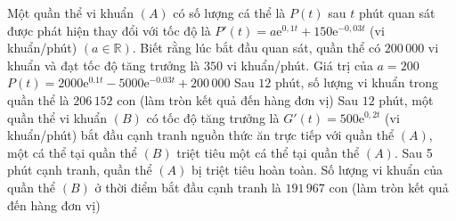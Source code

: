 \begin{ex}%
	Một quần thể vi khuẩn $(A)$ có số lượng cá thể là $P(t)$ sau $t$ phút quan sát được phát hiện thay đổi với tốc độ là $P'(t) = a\mathrm{e}^{0{,}1t} + 150\mathrm{e}^{-0{,}03t}$ (vi khuẩn/phút) $(a \in \mathbb{R})$. Biết rằng lúc bắt đầu quan sát, quần thể có $200\,000$ vi khuẩn và đạt tốc độ tăng trưởng là $350$ vi khuẩn/phút.
	\choiceTF
	{\True Giá trị của $a = 200$}
	{$P(t)=2000\mathrm{e}^{0.1 t} - 5000\mathrm{e}^{-0.03t}+ 200\,000$}
	{\True Sau $12$ phút, số lượng vi khuẩn trong quần thể là $206\,152$ con (làm tròn kết quả đến hàng đơn vị)}
	{Sau $12$ phút, một quần thể vi khuẩn $(B)$ có tốc độ tăng trưởng là $G'(t) = 500\mathrm{e}^{0{,}2t}$ (vi khuẩn/phút) bắt đầu cạnh tranh nguồn thức ăn trực tiếp với quần thể $(A)$, một cá thể tại quần thể $(B)$ triệt tiêu một cá thể tại quần thể $(A)$. Sau 5 phút cạnh tranh, quần thể $(A)$ bị triệt tiêu hoàn toàn. Số lượng vi khuẩn của quần thể $(B)$ ở thời điểm bắt đầu cạnh tranh là $191\,967$ con (làm tròn kết quả đến hàng đơn vị)}
\end{ex}

